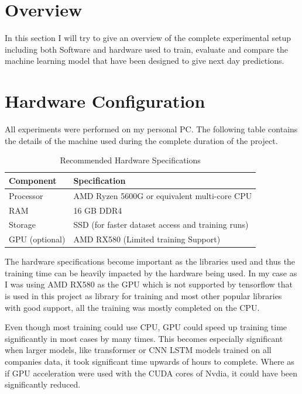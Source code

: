 \section{Overview}

In this section I will try to give an overview of the complete experimental setup including both Software and hardware used to train, evaluate and compare the machine learning model that have been designed to give next day predictions.

\section{Hardware Configuration}

All experiments were performed on my personal PC. The following table contains the details of the machine used during the complete duration of the project.

\begin{table}[h!]
    \centering
    \caption{Recommended Hardware Specifications}
    \label{tab:hardware_specs}
    \begin{tabular}{|l|p{8cm}|} %
        \hline
        \textbf{Component} & \textbf{Specification} \\
        \hline
        Processor & AMD Ryzen 5600G or equivalent multi-core CPU \\
        \hline
        RAM & 16 GB DDR4 \\
        \hline
        Storage & SSD (for faster dataset access and training runs) \\
        \hline
        GPU (optional) & AMD RX580 (Limited training Support) \\
        \hline
    \end{tabular}
\end{table}

The hardware specifications become important as the libraries used and thus the training time can be heavily impacted by the hardware being used. In my case as I was using AMD RX580 as the GPU which is not supported by tensorflow that is used in this project as library for training and most other popular libraries with good support, all the training was mostly completed on the CPU.

Even though most training could use CPU, GPU could speed up training time significantly in most cases by many times. This becomes especially significant when larger  models, like transformer or CNN LSTM models trained on all companies data, it took significant time upwards of hours to complete. Where as if GPU acceleration were used with the CUDA cores of Nvdia, it could have been significantly reduced.

